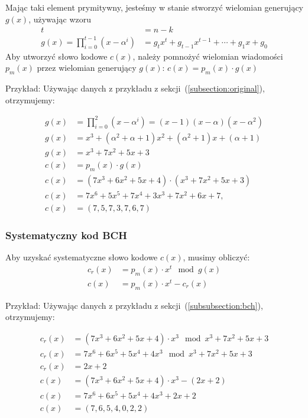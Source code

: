 Mając taki element prymitywny, jesteśmy w stanie stworzyć wielomian generujący $g(x)$, używając wzoru
\begin{align*}
    t &= n - k \\
    g(x) = \prod_{i=0}^{t-1} (x - \alpha^i) &= g_{t}x^t + g_{t-1}x^{t-1} +
    \cdots + g_{1}x + g_{0}
\end{align*}
Aby utworzyć słowo kodowe $c(x)$, należy pomnożyć wielomian wiadomości $p_m(x)$ przez wielomian generujący $g(x)$: $c(x) = p_{m}(x) \cdot g(x)$
\newline
\begin{minipage}{\textwidth}
Przykład:
\newline
Używając danych z przykładu z sekcji~(\ref{subsection:original}), otrzymujemy:
\end{minipage}
\begin{align*}
    g(x) &= \prod_{i=0}^{2} (x - \alpha^i) = (x - 1)(x - \alpha)(x - \alpha^2) \\
    g(x) &= x^3 + (\alpha^2 + \alpha + 1)x^2 + (\alpha^2 + 1)x + (\alpha + 1) \\
    g(x) &= x^3 + 7x^2 + 5x + 3 \\
    c(x) &= p_m(x) \cdot g(x) \\
    c(x) &= (7x^3 + 6x^2 + 5x + 4) \cdot (x^3 + 7x^2 + 5x + 3) \\
    c(x) &= 7x^6 + 5x^5 + 7x^4 + 3x^3 + 7x^2 + 6x + 7, \\
    c(x) &= (7,5,7,3,7,6,7)
\end{align*}

\subsubsection{Systematyczny kod BCH}\label{subsubsection:systematic-bch}

Aby uzyskać systematyczne słowo kodowe $c(x)$, musimy obliczyć:
\begin{align*}
    c_r(x) &= p_m(x) \cdot x^t \mod g(x) \\
    c(x) &= p_m(x) \cdot x^t - c_r(x)
\end{align*}
\begin{minipage}{\textwidth}
Przykład:
\newline
Używając danych z przykładu z sekcji~(\ref{subsubsection:bch}), otrzymujemy:
\end{minipage}
\begin{align*}
    c_r(x) &= (7x^3 + 6x^2 + 5x + 4) \cdot x^3 \mod x^3 + 7x^2 + 5x + 3 \\
    c_r(x) &= 7x^6 + 6x^5 + 5x^4 + 4x^3 \mod x^3 + 7x^2 + 5x + 3 \\
    c_r(x) &= 2x + 2 \\
    c(x) &= (7x^3 + 6x^2 + 5x + 4) \cdot x^3 - (2x + 2) \\
    c(x) &= 7x^6 + 6x^5 + 5x^4 + 4x^3 + 2x + 2 \\
    c(x) &= (7,6,5,4,0,2,2)
\end{align*}

